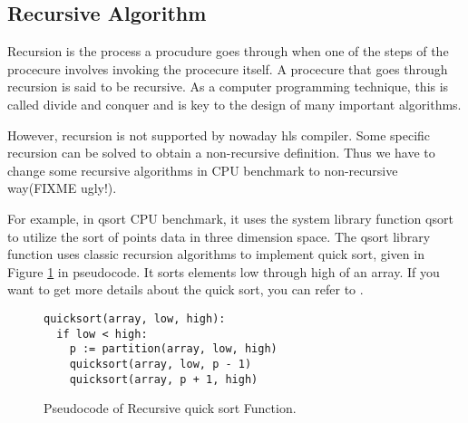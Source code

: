 \documentclass[conference]{IEEEtran}
\begin{document}


\subsection{Recursive Algorithm}
Recursion is the process a  procudure goes through when one of the steps of the procecure involves invoking the procecure itself. A procecure that goes through recursion is said to be recursive. As a computer programming technique, this is called divide and conquer and is key to the design of  many important algorithms.

However, recursion is not supported by nowaday hls compiler. Some specific recursion can be solved to obtain a non-recursive definition. Thus we have to change some recursive algorithms in CPU benchmark to non-recursive way(FIXME ugly!).

For example, in qsort CPU benchmark, it uses the system library function qsort to utilize the sort of points data in three dimension space. The qsort library function uses classic recursion algorithms to implement quick sort, given in Figure \ref{figure_qsort_recursive} in pseudocode. It sorts elements low through high of an array. If you want to get more details about the quick sort, you can refer to \cite{sedgewick1978implementing}.

\begin{figure}[h]\centering
{\fontsize{8}{8}\selectfont
\begin{lstlisting}[frame=lines]
quicksort(array, low, high):
  if low < high:
    p := partition(array, low, high)
    quicksort(array, low, p - 1)
    quicksort(array, p + 1, high)
\end{lstlisting}
}
\caption{Pseudocode of Recursive quick sort Function.}\label{figure_qsort_recursive}
\end{figure}
\end{document}
